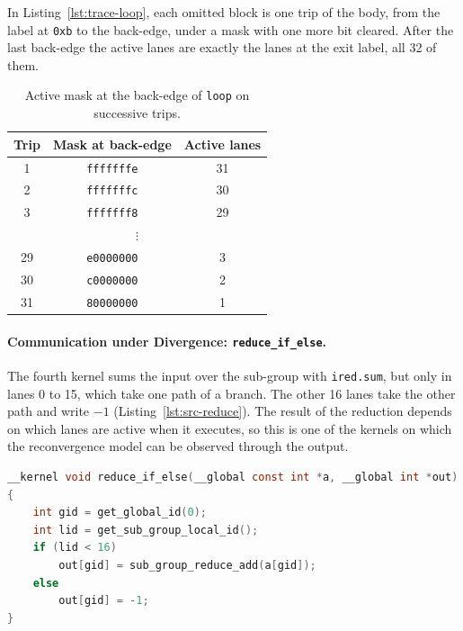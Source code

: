 In Listing~\ref{lst:trace-loop}, each omitted block is one trip of the body, from the
label at \texttt{0xb} to the back-edge, under a mask with one more bit
cleared. After the last back-edge the active lanes are exactly the
lanes at the exit label, all 32 of them.

\begin{table}[t]
\centering
\begin{tabular}{ccc}
\toprule
Trip & Mask at back-edge & Active lanes \\
\midrule
1  & \texttt{fffffffe} & 31 \\
2  & \texttt{fffffffc} & 30 \\
3  & \texttt{fffffff8} & 29 \\
\multicolumn{3}{c}{$\vdots$} \\
29 & \texttt{e0000000} & 3 \\
30 & \texttt{c0000000} & 2 \\
31 & \texttt{80000000} & 1 \\
\bottomrule
\end{tabular}
\caption[Active mask at the loop back-edge]{Active mask at the back-edge
of \texttt{loop} on successive trips.}
\label{tab:mask-staircase}
\end{table}

\paragraph{Communication under Divergence: \texttt{reduce\_if\_else}.}
The fourth kernel sums the input over the sub-group with
\texttt{ired.sum}, but only in lanes 0 to 15, which take one path of a
branch. The other 16 lanes take the other path and write $-1$
(Listing~\ref{lst:src-reduce}). The result of the reduction depends
on which lanes are active when it executes, so this is one of the
kernels on which the reconvergence model can be observed through the
output.

\begin{lstlisting}[language=C, caption={[Source of reduce\_if\_else]OpenCL
source of \texttt{reduce\_if\_else}.}, label={lst:src-reduce}]
__kernel void reduce_if_else(__global const int *a, __global int *out)
{
    int gid = get_global_id(0);
    int lid = get_sub_group_local_id();
    if (lid < 16)
        out[gid] = sub_group_reduce_add(a[gid]);
    else
        out[gid] = -1;
}
\end{lstlisting}

